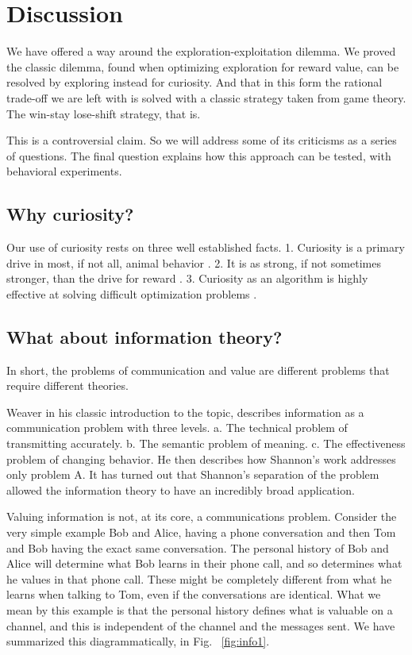 \section*{Discussion}
We have offered a way around the exploration-exploitation dilemma. We proved the classic dilemma, found when optimizing exploration for reward value, can be resolved by exploring instead for curiosity. And that in this form the rational trade-off we are left with is solved with a classic strategy taken from game theory. The win-stay lose-shift strategy, that is.

This is a controversial claim. So we will address some of its criticisms as a series of questions. The final question explains how this approach can be tested, with behavioral experiments. 

\subsection*{Why curiosity?}
Our use of curiosity rests on three well established facts. 1. Curiosity is a primary drive in most, if not all, animal behavior \cite{Inglis2001}. 2. It is as strong, if not sometimes stronger, than the drive for reward \cite{Loewenstein1994,Kidd2015,Gottlieb2018}. 3. Curiosity as an algorithm is highly effective at solving difficult optimization problems \cite{Schmidhuber1991,Pathak2017,Stanton2018,Lehman201,Mouret2011b1,Fister2019,Mouret2015,Colas2020,Cully2015,Pathak2017,Schwartenbeck2019,Laversanne-Finot2018}. 


\subsection*{What about information theory?}
In short, the problems of communication and value are different problems that require different theories.

Weaver \cite{Shannon1948} in his classic introduction to the topic, describes information as a communication problem with three levels. a. The technical problem of transmitting accurately. b. The semantic problem of meaning. c. The effectiveness problem of changing behavior. He then describes how Shannon's work addresses only problem A. It has turned out that Shannon's separation of the problem allowed the information theory to have an incredibly broad application. 

Valuing information is not, at its core, a communications problem. Consider the very simple example Bob and Alice, having a phone conversation and then Tom and Bob having the exact same conversation. The personal history of Bob and Alice will determine what Bob learns in their phone call, and so determines what he values in that phone call. These might be completely different from what he learns when talking to Tom, even if the conversations are identical. What we mean by this example is that the personal history defines what is valuable on a channel, and this is independent of the channel and the messages sent. We have summarized this diagrammatically, in Fig. ~\ref{fig:info1}.

